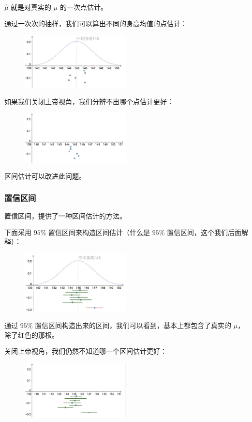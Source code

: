 \documentclass[12pt]{article}
\begin{document}
$\hat{\mu}$ 就是对真实的 $\mu$ 的一次点估计。

通过一次次的抽样，我们可以算出不同的身高均值的点估计：
\begin{figure}[H]
    \centering
    \includegraphics[width=0.5\textwidth]{fig/Confidence_Interval_Example_3.png}
\end{figure}

如果我们关闭上帝视角，我们分辨不出哪个点估计更好：
\begin{figure}[H]
    \centering
    \includegraphics[width=0.5\textwidth]{fig/Confidence_Interval_Example_4.png}
\end{figure}
区间估计可以改进此问题。

\subsubsection{置信区间}
置信区间，提供了一种区间估计的方法。

下面采用 $95\%$ 置信区间来构造区间估计（什么是 $95\%$  置信区间，这个我们后面解释）：
\begin{figure}[H]
    \centering
    \includegraphics[width=0.5\textwidth]{fig/Confidence_Interval_Example_5.png}
\end{figure}

通过 $95\%$ 置信区间构造出来的区间，我们可以看到，基本上都包含了真实的 $\mu$，除了红色的那根。

关闭上帝视角，我们仍然不知道哪一个区间估计更好：
\begin{figure}[H]
    \centering
    \includegraphics[width=0.5\textwidth]{fig/Confidence_Interval_Example_6.png}
\end{figure}
\end{document}
